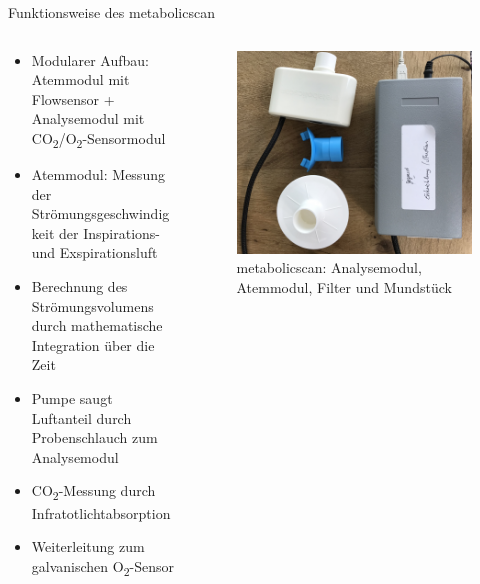 \documentclass[colorBG,slideColor,8pt]{beamer}
\begin{document}
\begin{frame}{Funktionsweise des metabolicscan}
\begin{columns}
\begin{column}{0.5\linewidth}
\begin{itemize}
	\item Modularer Aufbau: Atemmodul mit Flowsensor + Analysemodul mit CO\textsubscript{2}/O\textsubscript{2}-Sensormodul
	\item Atemmodul: Messung der Strömungsgeschwindigkeit der Inspirations- und Exspirationsluft
	\item Berechnung des Strömungsvolumens durch mathematische Integration über die Zeit
	\item Pumpe saugt Luftanteil durch Probenschlauch zum Analysemodul
	\item CO\textsubscript{2}-Messung durch Infratotlichtabsorption
	\item Weiterleitung zum galvanischen O\textsubscript{2}-Sensor
\end{itemize}
\end{column}
\begin{column}{0.5\linewidth}
			\begin{figure}[H]
				\centering
				\includegraphics[width=0.8\linewidth]{Bilder/mbs.jpg}
				\caption{metabolicscan: Analysemodul, Atemmodul, Filter und Mundstück}
			\end{figure}
\end{column}
\end{columns}
\end{frame}

\end{document}
